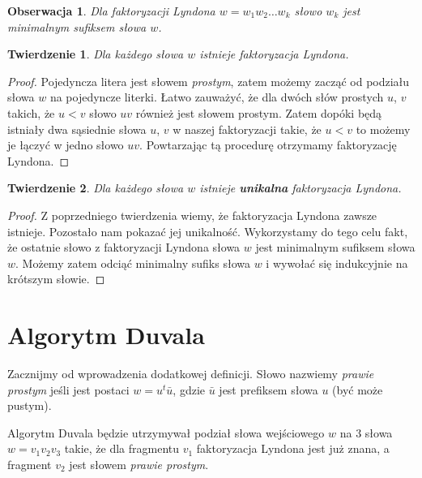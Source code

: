 \documentclass{article}
\newtheorem{theorem}{Twierdzenie}
\newtheorem{observation}{Obserwacja}
\begin{document}
\begin{observation}
    Dla faktoryzacji Lyndona $w = w_1w_2\ldots w_k$ słowo $w_k$ jest minimalnym sufiksem słowa $w$. 
\end{observation}

\begin{theorem}
    Dla każdego słowa $w$ istnieje faktoryzacja Lyndona.
\end{theorem}

\begin{proof}
    Pojedyncza litera jest słowem \textit{prostym}, zatem możemy zacząć od podziału słowa $w$ na pojedyncze literki.
    Łatwo zauważyć, że dla dwóch słów prostych $u$, $v$ takich, że $u < v$ słowo $uv$ również jest słowem prostym.
    Zatem dopóki będą istniały dwa sąsiednie słowa $u$, $v$ w naszej faktoryzacji takie, że $u < v$ to możemy je łączyć w jedno słowo $uv$.
    Powtarzając tą procedurę otrzymamy faktoryzację Lyndona.
\end{proof}

\begin{theorem}
    Dla każdego słowa $w$ istnieje \textbf{unikalna} faktoryzacja Lyndona.
\end{theorem}

\begin{proof}
    Z poprzedniego twierdzenia wiemy, że faktoryzacja Lyndona zawsze istnieje. Pozostało nam pokazać jej unikalność.
    Wykorzystamy do tego celu fakt, że ostatnie słowo z faktoryzacji Lyndona słowa $w$ jest minimalnym sufiksem słowa $w$. 
    Możemy zatem odciąć minimalny sufiks słowa $w$ i wywołać się indukcyjnie na krótszym słowie.
\end{proof}

\section{Algorytm Duvala}

Zacznijmy od wprowadzenia dodatkowej definicji. Słowo nazwiemy \textit{prawie prostym} jeśli jest postaci $w = u^t\bar{u}$, gdzie 
$\bar{u}$ jest prefiksem słowa $u$ (być może pustym).

Algorytm Duvala będzie utrzymywał podział słowa wejściowego $w$ na $3$ słowa $w=v_1v_2v_3$ takie, że dla fragmentu $v_1$ faktoryzacja Lyndona jest już znana, 
a fragment $v_2$ jest słowem \textit{prawie prostym}. 
\end{document}
